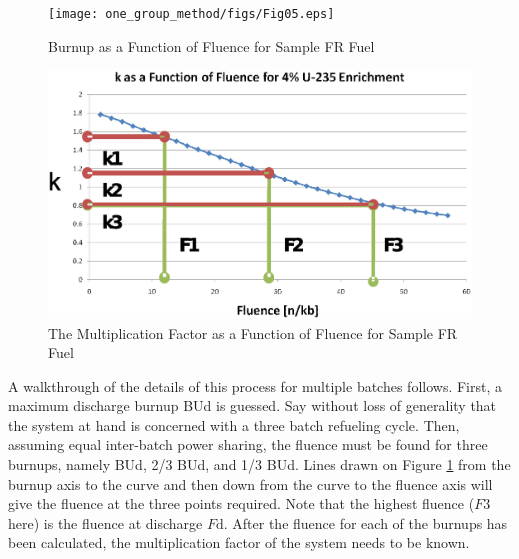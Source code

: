 \begin{figure}[htbp]
\caption{Burnup as a Function of Fluence for Sample FR Fuel}
\label{1g_fig05}
\begin{center}
\texttt{[image: one\_group\_method/figs/Fig05.eps]}
\end{center}
\end{figure}

\begin{figure}[htbp]
\caption{The Multiplication Factor as a Function of Fluence for Sample FR Fuel}
\label{1g_fig06}
\begin{center}
\includegraphics[scale=0.5]{one_group_method/figs/Fig06.eps}
\end{center}
\end{figure}

A walkthrough of the details of this process for multiple batches follows.  First, a maximum 
discharge burnup BUd is guessed.  Say without loss of generality that the system at hand is 
concerned with a three batch refueling cycle.  Then, assuming equal inter-batch power sharing, 
the fluence must be found for three burnups, namely BUd, 2/3 BUd, and 1/3 BUd.   Lines drawn on 
Figure \ref{1g_fig05} from the burnup axis to the curve and then down from the curve to the fluence 
axis will give the fluence at the three points required.  Note that the highest fluence ($F3$ here) 
is the fluence at discharge $F\mbox{d}$.  After the fluence for each of the burnups has been calculated, 
the multiplication factor of the system needs to be known. 

